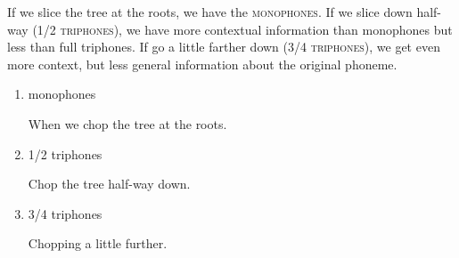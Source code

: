 \documentclass[10pt,a4paper]{article}
\begin{document}
\begin{enumerate}
  If we slice the tree at the roots, we have the \textsc{monophones}. If we slice down half-way (\textsc{1/2 triphones}), we have more contextual information than monophones but less than full triphones. If go a little farther down (\textsc{3/4 triphones}), we get even more context, but less general information about the original phoneme.
  
  \begin{enumerate}
  \item monophones

    When we chop the tree at the roots.
    
  \item 1/2 triphones

    Chop the tree half-way down.
    
  \item 3/4 triphones

    Chopping a little further.
    
  \end{enumerate}


  


\end{enumerate}
\end{document}
